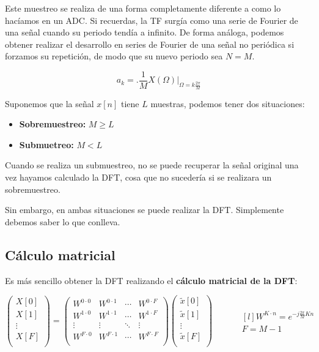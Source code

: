 \documentclass[a4paper,oneside]{book}
\begin{document}
Este muestreo se realiza de una forma completamente diferente a como lo hacíamos en un ADC. Si recuerdas, la TF surgía como una serie de Fourier de una señal cuando su periodo tendía a infinito. De forma análoga, podemos obtener realizar el desarrollo en series de Fourier de una señal no periódica si forzamos su repetición, de modo que su nuevo periodo sea $N = M$.

\[ a_k = \biggl. \frac{1}{M} X(\Omega ) \biggr\vert _{\Omega = k \frac{2\pi}{M}}\]

Suponemos que la señal $x[n]$ tiene $L$ muestras, podemos tener dos situaciones:
\begin{multicols}{2}
	\begin{itemize}
		\item \textbf{Sobremuestreo:} $\boxed{M\geq L}$
		\item \textbf{Submuetreo:} $\boxed{M<L}$
	\end{itemize}
\end{multicols}

Cuando se realiza un submuestreo, no se puede recuperar la señal original una vez hayamos calculado la DFT, cosa que no sucedería si se realizara un sobremuestreo.

Sin embargo, en ambas situaciones se puede realizar la DFT. Simplemente debemos saber lo que conlleva.

\subsection{Cálculo matricial}

Es más sencillo obtener la DFT realizando el \textbf{cálculo matricial de la DFT}:

\[ \left( 
\begin{matrix}
	X[0]\\
	X[1]\\
	\vdots \\
	X[F]\\
\end{matrix} \right)
= \left(
\begin{matrix}
	W^{0 \cdot 0} & W^{0 \cdot 1} & \cdots & W^{0 \cdot F}\\
	W^{1 \cdot 0} & W^{1 \cdot 1} & \cdots & W^{1 \cdot F}\\
	\vdots & \vdots & \ddots & \vdots \\
	W^{F \cdot 0} & W^{F \cdot 1} & \cdots & W^{F \cdot F}\\
\end{matrix} \right)
\left( \begin{matrix}
	\tilde{x}[0]\\
	\tilde{x}[1]\\
	\vdots\\
	\tilde{x}[F]\\
\end{matrix} \right)
\qquad \quad 
\begin{matrix*}[l]
	W^{K \cdot n} = e^{-j \frac{2\pi}{M}Kn}\\[5pt]
	F = M - 1
\end{matrix*}
\]
\end{document}
